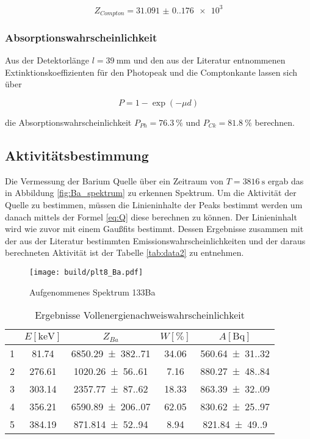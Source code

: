 \begin{equation*}
	Z_{Compton}=\num{31.091(0.176)e3}
\end{equation*}

\subsubsection{Absorptionswahrscheinlichkeit}
Aus der Detektorlänge $l=\qty{39}{\milli\meter}$ und den aus der Literatur
\cite{web:nist} entnommenen Extinktionskoeffizienten für den Photopeak und die
Comptonkante lassen sich über

\begin{equation}
	P=1-\exp(-\mu d)
	\label{eq:Absorption}
\end{equation}

die Absorptionswahrscheinlichkeit $P_{Ph}=\qty{76.3}{\%}$ und
$P_{Ck}=\qty{81.8}{\%}$ berechnen.

\subsection{Aktivitätsbestimmung}
Die Vermessung der Barium Quelle über ein Zeitraum von $T=\qty{3816}{\second}$
ergab das in Abbildung \eqref{fig:Ba_spektrum} zu erkennen Spektrum. Um die
Aktivität der Quelle zu bestimmen, müssen die Linieninhalte der Peaks bestimmt
werden um danach mittels der Formel \eqref{eq:Q} diese berechnen zu können. Der
Linieninhalt wird wie zuvor mit einem Gaußfits bestimmt. Dessen Ergebnisse
zusammen mit der aus der Literatur \cite{web:nuclear} bestimmten
Emissionswahrscheinlichkeiten und der daraus berechneten Aktivität ist der
Tabelle \eqref{tab:data2} zu entnehmen.

\begin{figure}[H]
	\centering
	\texttt{[image: build/plt8\_Ba.pdf]}
	\caption{Aufgenommenes Spektrum 133Ba}
	\label{fig:Ba_spektrum}
\end{figure}

\begin{table}[H]
	\centering
	\caption{Ergebnisse Vollenergienachweiswahrscheinlichkeit}
	\begin{tabular}{c c c c c}
		\toprule
		\text{Peak} & $ E [\unit{\kilo\eV}] $ & $ Z_{Ba} $            & $ W [\%] $  & $ A [\unit{\becquerel}] $ \\
		\midrule
		1           & \num{81.74}             & \num{6850.29(382.71)} & \num{34.06} & \num{560.64(31.32)}       \\
		2           & \num{276.61}            & \num{1020.26(56.61)}  & \num{7.16}  & \num{880.27(48.84)}       \\
		3           & \num{303.14}            & \num{2357.77(87.62)}  & \num{18.33} & \num{863.39(32.09)}       \\
		4           & \num{356.21}            & \num{6590.89(206.07)} & \num{62.05} & \num{830.62(25.97)}       \\
		5           & \num{384.19}            & \num{871.814(52.94)}  & \num{8.94}  & \num{821.84(49.90)}       \\
		\bottomrule
	\end{tabular}
	\label{tab:data2}
\end{table}

